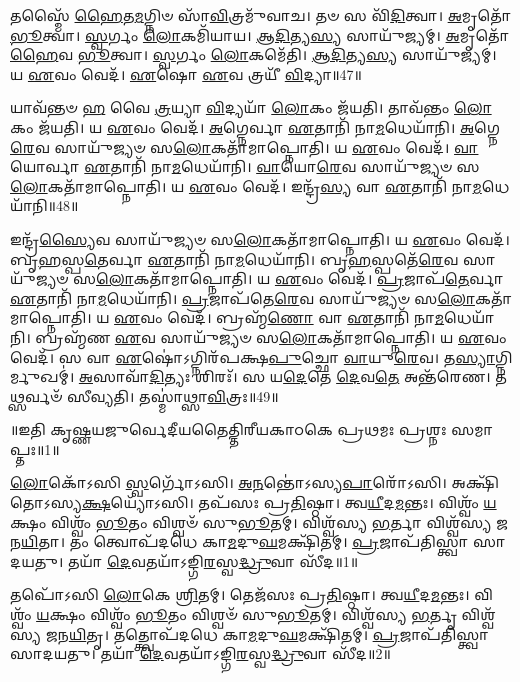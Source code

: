    𑌤𑌸𑍍𑌮𑍈᳴ \ul{𑌹𑍈}\-𑌤\-\ul{𑌮}\-𑌗𑍍𑌨𑌿𑍞 𑌸𑌾᳴\-\ul{𑌵𑌿}\-𑌤𑍍𑌰𑌮𑍁᳴𑌵𑌾𑌚।
   𑌤𑍞 𑌸 𑌵𑌿᳴\-\ul{𑌦𑌿}\-𑌤𑍍𑌵𑌾।
   \ul{𑌅}\-𑌮𑍃𑌤𑍋᳴ \ul{𑌭𑍂}\-𑌤𑍍𑌵𑌾।
   \ul{𑌸𑍍𑌵}\-𑌰𑍍𑌗𑌂 \ul{𑌲𑍋}\-𑌕𑌮𑌿᳴𑌯𑌾𑌯।
   \ul{𑌆}\-\-\ul{𑌦𑌿}\-𑌤𑍍𑌯\-\ul{𑌸𑍍𑌯} 𑌸𑌾𑌯𑍁᳴𑌜𑍍𑌯𑌮𑍍।
   \ul{𑌅}\-𑌮𑍃𑌤𑍋᳴ \ul{𑌹𑍈}\-𑌵 \ul{𑌭𑍂}\-𑌤𑍍𑌵𑌾।
   \ul{𑌸𑍍𑌵}\-𑌰𑍍𑌗𑌂 \ul{𑌲𑍋}\-𑌕𑌮𑍇᳴𑌤𑌿।
   \ul{𑌆}\-\-\ul{𑌦𑌿}\-𑌤𑍍𑌯\-\ul{𑌸𑍍𑌯} 𑌸𑌾𑌯𑍁᳴𑌜𑍍𑌯𑌮𑍍।
   𑌯 \ul{𑌏}\-𑌵𑌂 𑌵𑍇𑌦᳴।
   \ul{𑌏}\-𑌷𑍋 \ul{𑌏}\-𑌵 𑌤𑍍𑌰𑌯𑍀᳴ \ul{𑌵𑌿}\-𑌦𑍍𑌯𑌾॥47॥

   𑌯𑌾𑌵᳴𑌨𑍍𑌤𑍞 \ul{𑌹} 𑌵𑍈 \ul{𑌤𑍍𑌰}\-𑌯𑍍𑌯𑌾 \ul{𑌵𑌿}\-𑌦𑍍𑌯𑌯𑌾᳴ \ul{𑌲𑍋}\-𑌕𑌂 𑌜᳴𑌯𑌤𑌿।
   𑌤𑌾𑌵᳴𑌨𑍍𑌤𑌂 \ul{𑌲𑍋}\-𑌕𑌂 𑌜᳴𑌯𑌤𑌿।
   𑌯 \ul{𑌏}\-𑌵𑌂 𑌵𑍇𑌦᳴।
   \ul{𑌅}\-𑌗𑍍𑌨𑍇𑌰𑍍𑌵𑌾 \ul{𑌏}\-𑌤𑌾𑌨𑌿᳴ 𑌨𑌾\-\ul{𑌮}\-\-𑌧𑍇𑌯𑌾᳴𑌨𑌿।
   \ul{𑌅}\-𑌗𑍍𑌨𑍇\-\ul{𑌰𑍇}\-𑌵 𑌸𑌾𑌯𑍁᳴𑌜𑍍𑌯𑍞 𑌸\-\ul{𑌲𑍋}\-𑌕𑌤𑌾᳴𑌮𑌾𑌪𑍍𑌨𑍋𑌤𑌿।
   𑌯 \ul{𑌏}\-𑌵𑌂 𑌵𑍇𑌦᳴।
   \ul{𑌵𑌾}\-𑌯𑍋𑌰𑍍𑌵𑌾 \ul{𑌏}\-𑌤𑌾𑌨𑌿᳴ 𑌨𑌾\-\ul{𑌮}\-\-𑌧𑍇𑌯𑌾᳴𑌨𑌿।
   \ul{𑌵𑌾}\-𑌯𑍋\-\ul{𑌰𑍇}\-𑌵 𑌸𑌾𑌯𑍁᳴𑌜𑍍𑌯𑍞 𑌸\-\ul{𑌲𑍋}\-𑌕𑌤𑌾᳴𑌮𑌾𑌪𑍍𑌨𑍋𑌤𑌿।
   𑌯 \ul{𑌏}\-𑌵𑌂 𑌵𑍇𑌦᳴।
   𑌇𑌨𑍍𑌦𑍍𑌰᳴\-\ul{𑌸𑍍𑌯} 𑌵𑌾 \ul{𑌏}\-𑌤𑌾𑌨𑌿᳴ 𑌨𑌾\-\ul{𑌮}\-\-𑌧𑍇𑌯𑌾᳴𑌨𑌿॥48॥

   𑌇𑌨𑍍𑌦𑍍𑌰᳴\-\ul{𑌸𑍍𑌯𑍈}\-𑌵 𑌸𑌾𑌯𑍁᳴𑌜𑍍𑌯𑍞 𑌸\-\ul{𑌲𑍋}\-𑌕𑌤𑌾᳴𑌮𑌾𑌪𑍍𑌨𑍋𑌤𑌿।
   𑌯 \ul{𑌏}\-𑌵𑌂 𑌵𑍇𑌦᳴।
   𑌬𑍃\-\ul{𑌹}\-𑌸𑍍𑌪\-\ul{𑌤𑍇}\-𑌰𑍍𑌵𑌾 \ul{𑌏}\-𑌤𑌾𑌨𑌿᳴ 𑌨𑌾\-\ul{𑌮}\-\-𑌧𑍇𑌯𑌾᳴𑌨𑌿।
   𑌬𑍃\-\ul{𑌹}\-𑌸𑍍𑌪𑌤𑍇᳴\-\ul{𑌰𑍇}\-𑌵 𑌸𑌾𑌯𑍁᳴𑌜𑍍𑌯𑍞 𑌸\-\ul{𑌲𑍋}\-𑌕𑌤𑌾᳴𑌮𑌾𑌪𑍍𑌨𑍋𑌤𑌿।
   𑌯 \ul{𑌏}\-𑌵𑌂 𑌵𑍇𑌦᳴।
   \ul{𑌪𑍍𑌰}\-𑌜𑌾𑌪᳴\-\ul{𑌤𑍇}\-𑌰𑍍𑌵𑌾 \ul{𑌏}\-𑌤𑌾𑌨𑌿᳴ 𑌨𑌾\-\ul{𑌮}\-\-𑌧𑍇𑌯𑌾᳴𑌨𑌿।
   \ul{𑌪𑍍𑌰}\-𑌜𑌾𑌪᳴𑌤𑍇\-\ul{𑌰𑍇}\-𑌵 𑌸𑌾𑌯𑍁᳴𑌜𑍍𑌯𑍞 𑌸\-\ul{𑌲𑍋}\-𑌕𑌤𑌾᳴𑌮𑌾𑌪𑍍𑌨𑍋𑌤𑌿।
   𑌯 \ul{𑌏}\-𑌵𑌂 𑌵𑍇𑌦᳴।
   𑌬𑍍𑌰𑌹𑍍𑌮᳴\-\ul{𑌣𑍋} 𑌵𑌾 \ul{𑌏}\-𑌤𑌾𑌨𑌿᳴ 𑌨𑌾\-\ul{𑌮}\-\-𑌧𑍇𑌯𑌾᳴𑌨𑌿।
   𑌬𑍍𑌰𑌹𑍍𑌮᳴𑌣 \ul{𑌏}\-𑌵 𑌸𑌾𑌯𑍁᳴𑌜𑍍𑌯𑍞 𑌸\-\ul{𑌲𑍋}\-𑌕𑌤𑌾᳴𑌮𑌾𑌪𑍍𑌨𑍋𑌤𑌿।
   𑌯 \ul{𑌏}\-𑌵𑌂 𑌵𑍇𑌦᳴।
   𑌸 𑌵𑌾 \ul{𑌏}\-𑌷𑍋॑𑌽𑌗𑍍𑌨𑌿𑌰᳴𑌪𑌕𑍍𑌷\-\ul{𑌪𑍁}\-𑌚𑍍𑌛𑍋 \ul{𑌵𑌾}\-𑌯𑍁\-\ul{𑌰𑍇}\-𑌵।
   𑌤\-\ul{𑌸𑍍𑌯𑌾}\-𑌗𑍍𑌨𑌿𑌰𑍍𑌮𑍁𑌖𑌮𑍍॑।
   \ul{𑌅}\-𑌸𑌾𑌵𑌾᳴\-\ul{𑌦𑌿}\-𑌤𑍍𑌯𑌃 𑌶𑌿𑌰𑌃᳴।
   𑌸 𑌯\-\ul{𑌦𑍇}\-𑌤𑍇 \ul{𑌦𑍇}\-𑌵\-\ul{𑌤𑍇} 𑌅𑌨𑍍𑌤᳴𑌰𑍇𑌣।
   𑌤𑌥𑍍𑌸𑌰𑍍𑌵𑍞᳴ 𑌸𑍀𑌵𑍍𑌯𑌤𑌿।
   𑌤𑌸𑍍𑌮𑌾॑𑌥𑍍𑌸𑌾\-\ul{𑌵𑌿}\-𑌤𑍍𑌰𑌃॥49॥
   \anuvakamend
   
॥𑌇𑌤𑌿 𑌕𑍃𑌷𑍍𑌣𑌯𑌜𑍁𑌰𑍍𑌵𑍇𑌦𑍀𑌯𑌤𑍈𑌤𑍍𑌤𑌿𑌰𑍀𑌯𑌕𑌾𑌠𑌕𑍇 𑌪𑍍𑌰𑌥𑌮𑌃 𑌪𑍍𑌰𑌶𑍍𑌨𑌃 𑌸𑌮𑌾𑌪𑍍𑌤𑌃॥1॥

\setcounter{anuvakam}{0}

   \ul{𑌲𑍋}\-𑌕𑍋᳴𑌽𑌸𑌿 \ul{𑌸𑍍𑌵}\-𑌰𑍍𑌗𑍋᳴𑌽𑌸𑌿।
   \ul{𑌅}\-\-\ul{𑌨}\-𑌨𑍍𑌤𑍋॑𑌽𑌸𑍍𑌯\-\ul{𑌪𑌾}\-𑌰𑍋᳴𑌽𑌸𑌿।
   𑌅𑌕𑍍𑌷𑌿᳴𑌤𑍋\-𑌽𑌸𑍍𑌯\-\ul{𑌕𑍍𑌷}\-𑌯𑍍𑌯𑍋᳴\-𑌽𑌸𑌿।
   𑌤𑌪᳴𑌸𑌃 𑌪𑍍𑌰\-\ul{𑌤𑌿}\-𑌷𑍍𑌠𑌾।
   𑌤𑍍𑌵\-\ul{𑌯𑍀}\-𑌦\-\ul{𑌮}\-𑌨𑍍𑌤𑌃।
   𑌵𑌿𑌶𑍍𑌵𑌂᳴ \ul{𑌯}\-𑌕𑍍𑌷𑌂 𑌵𑌿𑌶𑍍𑌵𑌂᳴ \ul{𑌭𑍂}\-𑌤𑌂 𑌵𑌿𑌶𑍍𑌵𑍞᳴ 𑌸𑍁\-\ul{𑌭𑍂}\-𑌤𑌮𑍍।
   𑌵𑌿𑌶𑍍𑌵᳴𑌸𑍍𑌯 \ul{𑌭}\-𑌰𑍍𑌤𑌾 𑌵𑌿𑌶𑍍𑌵᳴𑌸𑍍𑌯 𑌜𑌨\-\ul{𑌯𑌿}\-𑌤𑌾।
   𑌤𑌂 𑌤𑍍𑌵𑍋𑌪᳴𑌦𑌧𑍇 𑌕𑌾\-\ul{𑌮}\-𑌦𑍁\-\ul{𑌘}\-𑌮𑌕𑍍𑌷𑌿᳴𑌤𑌮𑍍।
   \ul{𑌪𑍍𑌰}\-𑌜𑌾𑌪᳴𑌤𑌿𑌸𑍍𑌤𑍍𑌵𑌾 𑌸𑌾𑌦𑌯𑌤𑍁।
   𑌤𑌯𑌾᳴ \ul{𑌦𑍇}\-𑌵𑌤𑌯𑌾᳴𑌽𑌙𑍍𑌗𑌿\-\ul{𑌰}\-𑌸𑍍𑌵\-\ul{𑌦𑍍𑌧𑍍𑌰𑍁}\-𑌵𑌾 𑌸𑍀᳴𑌦॥1॥

   𑌤𑌪𑍋᳴𑌽𑌸𑌿 \ul{𑌲𑍋}\-𑌕𑍇 \ul{𑌶𑍍𑌰𑌿}\-𑌤𑌮𑍍।
   𑌤𑍇𑌜᳴𑌸𑌃 𑌪𑍍𑌰\-\ul{𑌤𑌿}\-𑌷𑍍𑌠𑌾।
   𑌤𑍍𑌵\-\ul{𑌯𑍀}\-𑌦\-\ul{𑌮}\-𑌨𑍍𑌤𑌃।
   𑌵𑌿𑌶𑍍𑌵𑌂᳴ \ul{𑌯}\-𑌕𑍍𑌷𑌂 𑌵𑌿𑌶𑍍𑌵𑌂᳴ \ul{𑌭𑍂}\-𑌤𑌂 𑌵𑌿𑌶𑍍𑌵𑍞᳴ 𑌸𑍁\-\ul{𑌭𑍂}\-𑌤𑌮𑍍।
   𑌵𑌿𑌶𑍍𑌵᳴𑌸𑍍𑌯 \ul{𑌭}\-𑌰𑍍𑌤𑍃 𑌵𑌿𑌶𑍍𑌵᳴𑌸𑍍𑌯 𑌜𑌨\-\ul{𑌯𑌿}\-𑌤𑍃।
   𑌤𑌤𑍍𑌤𑍍𑌵𑍋𑌪᳴𑌦𑌧𑍇 𑌕𑌾\-\ul{𑌮}\-𑌦𑍁\-\ul{𑌘}\-𑌮𑌕𑍍𑌷𑌿᳴𑌤𑌮𑍍।
   \ul{𑌪𑍍𑌰}\-𑌜𑌾𑌪᳴𑌤𑌿𑌸𑍍𑌤𑍍𑌵𑌾 𑌸𑌾𑌦𑌯𑌤𑍁।
   𑌤𑌯𑌾᳴ \ul{𑌦𑍇}\-𑌵𑌤𑌯𑌾᳴𑌽𑌙𑍍𑌗𑌿\-\ul{𑌰}\-𑌸𑍍𑌵\-\ul{𑌦𑍍𑌧𑍍𑌰𑍁}\-𑌵𑌾 𑌸𑍀᳴𑌦॥2॥

